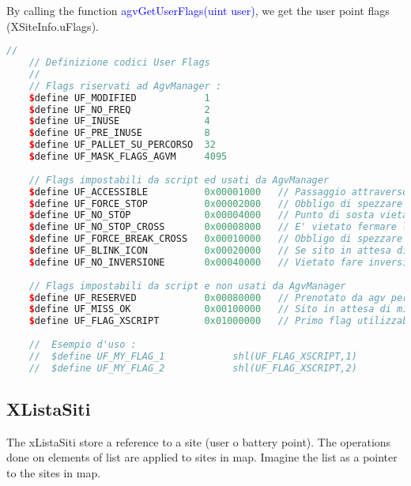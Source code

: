 By calling the function \textcolor{blue}{agvGetUserFlags(uint user)}, we get the user point flags (XSiteInfo.uFlags).
\begin{lstlisting}[language=c++,caption= User point flags, label= lstUserFlags]
	//
	// Definizione codici User Flags
	//
	// Flags riservati ad AgvManager :
	$define UF_MODIFIED            1
	$define UF_NO_FREQ             2
	$define UF_INUSE               4
	$define UF_PRE_INUSE           8
	$define UF_PALLET_SU_PERCORSO  32
	$define UF_MASK_FLAGS_AGVM     4095
	
	// Flags impostabili da script ed usati da AgvManager
	$define UF_ACCESSIBLE          0x00001000	// Passaggio attraverso user possibile (default vero)
	$define UF_FORCE_STOP          0x00002000	// Obbligo di spezzare movimento
	$define UF_NO_STOP             0x00004000	// Punto di sosta vietata
	$define UF_NO_STOP_CROSS       0x00008000	// E' vietato fermare l'agv su questo incrocio
	$define UF_FORCE_BREAK_CROSS   0x00010000	// Obbligo di spezzare movimento su incrocio
	$define UF_BLINK_ICON          0x00020000	// Se sito in attesa di missione o riservato, icona blinka
	$define UF_NO_INVERSIONE       0x00040000	// Vietato fare inversione su questo punto
	
	// Flags impostabili da script e non usati da AgvManager
	$define UF_RESERVED            0x00080000	// Prenotato da agv per missione (viene disegnato bollo rosso)
	$define UF_MISS_OK             0x00100000	// Sito in attesa di missione (viene disegnato bollo verde)
	$define UF_FLAG_XSCRIPT        0x01000000	// Primo flag utilizzabile liberamente da script
	
	//  Esempio d'uso :
	//  $define UF_MY_FLAG_1			shl(UF_FLAG_XSCRIPT,1)
	//  $define UF_MY_FLAG_2			shl(UF_FLAG_XSCRIPT,2)
\end{lstlisting}


\subsection{XListaSiti}
The xListaSiti store a reference to a site (user o battery point). The operations done on elements of list are applied to sites in map. Imagine the list as a pointer to the sites in map.

